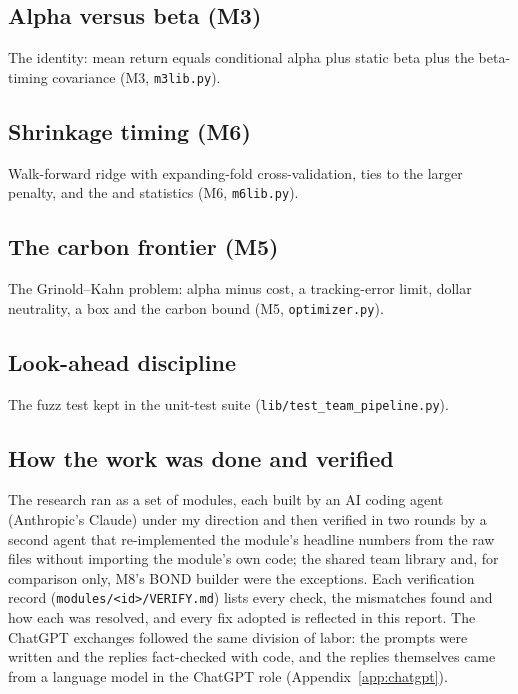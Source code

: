 \subsection{Alpha versus beta (M3)}
The \citet{ln2006} identity: mean return equals conditional alpha plus static beta plus the beta-timing covariance (M3, \texttt{m3lib.py}).


\subsection{Shrinkage timing (M6)}
Walk-forward ridge with expanding-fold cross-validation, ties to the larger penalty, and the \citet{ct2008} and \citet{cw2007} statistics (M6, \texttt{m6lib.py}).



\subsection{The carbon frontier (M5)}
The Grinold--Kahn problem: alpha minus cost, a tracking-error limit, dollar neutrality, a box and the carbon bound (M5, \texttt{optimizer.py}).


\subsection{Look-ahead discipline}
The fuzz test kept in the unit-test suite (\texttt{lib/test\_team\_pipeline.py}).


\subsection{How the work was done and verified}
The research ran as a set of modules, each built by an AI coding agent (Anthropic's Claude) under my direction and then verified in two rounds by a second agent that re-implemented the module's headline numbers from the raw files without importing the module's own code; the shared team library and, for comparison only, M8's BOND builder were the exceptions. Each verification record (\texttt{modules/<id>/VERIFY.md}) lists every check, the mismatches found and how each was resolved, and every fix adopted is reflected in this report. The ChatGPT exchanges followed the same division of labor: the prompts were written and the replies fact-checked with code, and the replies themselves came from a language model in the ChatGPT role (Appendix~\ref{app:chatgpt}).

